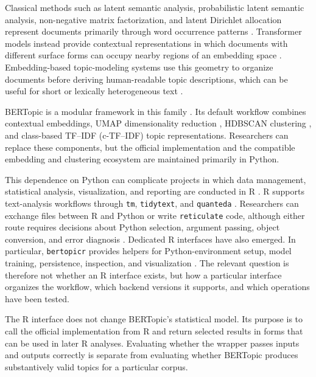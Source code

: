 \documentclass[12pt]{article}
\newcommand{\pkg}[1]{\texttt{#1}}
\begin{document}
Classical methods such as latent semantic analysis, probabilistic latent semantic analysis, non-negative matrix factorization, and latent Dirichlet allocation represent documents primarily through word occurrence patterns \citep{deerwester1990latent,hofmann1999plsa,lee1999nmf,blei2003latent}. Transformer models instead provide contextual representations in which documents with different surface forms can occupy nearby regions of an embedding space \citep{vaswani2017attention,devlin2019bert,reimers2019sentence}. Embedding-based topic-modeling systems use this geometry to organize documents before deriving human-readable topic descriptions, which can be useful for short or lexically heterogeneous text \citep{angelov2020top2vec,bianchi2021pretraining}.

BERTopic is a modular framework in this family \citep{grootendorst2022bertopic}. Its default workflow combines contextual embeddings, UMAP dimensionality reduction \citep{mcinnes2018umap}, HDBSCAN clustering \citep{campello2013density,mcinnes2017hdbscan}, and class-based TF--IDF (c-TF--IDF) topic representations. Researchers can replace these components, but the official implementation and the compatible embedding and clustering ecosystem are maintained primarily in Python.

This dependence on Python can complicate projects in which data management, statistical analysis, visualization, and reporting are conducted in R \citep{rcore2026}. R supports text-analysis workflows through \pkg{tm}, \pkg{tidytext}, and \pkg{quanteda} \citep{feinerer2008tm,silge2016tidytext,benoit2018quanteda}. Researchers can exchange files between R and Python or write \pkg{reticulate} code, although either route requires decisions about Python selection, argument passing, object conversion, and error diagnosis \citep{ushey2026reticulate}. Dedicated R interfaces have also emerged. In particular, \pkg{bertopicr} provides helpers for Python-environment setup, model training, persistence, inspection, and visualization \citep{petric2026bertopicr}. The relevant question is therefore not whether an R interface exists, but how a particular interface organizes the workflow, which backend versions it supports, and which operations have been tested.

The R interface does not change BERTopic's statistical model. Its purpose is to call the official implementation from R and return selected results in forms that can be used in later R analyses. Evaluating whether the wrapper passes inputs and outputs correctly is separate from evaluating whether BERTopic produces substantively valid topics for a particular corpus.
\end{document}
